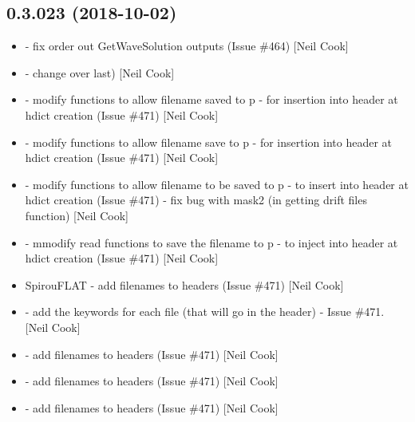 \documentclass[a4paper,10pt,english]{report}
\begin{document}
\subsection{0.3.023 (2018-10-02)}
\label{\detokenize{misc/changelog:id308}}\begin{itemize}
\item {} 
 - fix order out GetWaveSolution outputs (Issue
\#464) {[}Neil Cook{]}

\item {} 
 - change over  last) {[}Neil Cook{]}

\item {} 
 - modify functions to allow filename saved to p -
for insertion into header at hdict creation (Issue  \#471) {[}Neil Cook{]}

\item {} 
 - modify functions to allow filename save to p - for
insertion into header at hdict creation (Issue  \#471) {[}Neil Cook{]}

\item {} 
 - modify functions to allow filename to be saved to p -
to insert into header at hdict creation (Issue  \#471) - fix bug with
mask2 (in getting drift files function) {[}Neil Cook{]}

\item {} 
 - mmodify read functions to save the filename to p - to
inject into header at hdict creation (Issue  \#471) {[}Neil Cook{]}

\item {} 
SpirouFLAT - add filenames to headers (Issue  \#471) {[}Neil Cook{]}

\item {} 
 - add the keywords for each file (that will go in
the header) - Issue  \#471. {[}Neil Cook{]}

\item {} 
 - add filenames to headers (Issue  \#471) {[}Neil Cook{]}

\item {} 
 - add filenames to headers (Issue  \#471)
{[}Neil Cook{]}

\item {} 
 - add filenames to headers (Issue  \#471) {[}Neil Cook{]}


\end{itemize}
\end{document}
